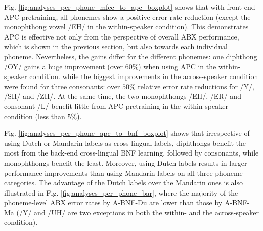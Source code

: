 \documentclass[transmag]{IEEEtran}
\begin{document}

Fig. \ref{fig:analyses_per_phone_mfcc_to_apc_boxplot} shows that  with front-end APC pretraining, all phonemes show a
positive error rate reduction (except the monophthong vowel /EH/ in the within-speaker condition). 
This demonstrates APC is effective not only from the perspective of overall ABX performance, which is shown in the previous section, but also towards each individual phoneme. Nevertheless, the gains differ for the different phonemes: one diphthong /OY/ gains a huge improvement  (over $60\%$) when using APC  in the within-speaker condition. while the biggest improvements in the across-speaker condition were found for three consonants: over $50\%$ relative error rate reductions for /Y/, /SH/ and /ZH/. At the same time, the two monophthongs /EH/, /ER/ and consonant /L/ benefit little from APC pretraining in the within-speaker condition  (less than $5\%$). 

Fig. \ref{fig:analyses_per_phone_apc_to_bnf_boxplot} shows that irrespective of using Dutch or Mandarin labels as cross-lingual labels, diphthongs benefit the most from the back-end cross-lingual BNF learning, followed by consonants, while monophthongs benefit the least. Moreover,  using Dutch labels results in larger performance improvements than using Mandarin labels on all three phoneme categories. The advantage of the Dutch labels over the Mandarin ones is also illustrated in Fig. \ref{fig:analyses_per_phone_bar}, where the majority of the phoneme-level ABX error rates by A-BNF-Du are lower than those by A-BNF-Ma (/Y/ and /UH/ are two exceptions in both the within- and the across-speaker condition).
\end{document}
